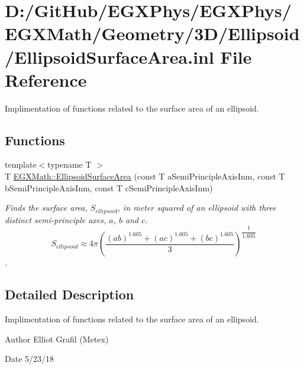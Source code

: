 \hypertarget{_ellipsoid_surface_area_8inl}{}\section{D\+:/\+Git\+Hub/\+E\+G\+X\+Phys/\+E\+G\+X\+Phys/\+E\+G\+X\+Math/\+Geometry/3\+D/\+Ellipsoid/\+Ellipsoid\+Surface\+Area.inl File Reference}
\label{_ellipsoid_surface_area_8inl}


Implimentation of functions related to the surface area of an ellipsoid.  


\subsection*{Functions}
\begin{DoxyCompactItemize}
\item 
{\footnotesize template$<$typename T $>$ }\\T \mbox{\hyperlink{group___e_g_x_math-_geometry-3_d-_ellipsoid-_surface_area_gae1dfe0a51a3adc5121de3ced76b4068c}{E\+G\+X\+Math\+::\+Ellipsoid\+Surface\+Area}} (const T a\+Semi\+Principle\+Axis\+Inm, const T b\+Semi\+Principle\+Axis\+Inm, const T c\+Semi\+Principle\+Axis\+Inm)
\begin{DoxyCompactList}\small\item\em Finds the surface area, $S_{ellipsoid}$, in meter squared of an ellipsoid with three distinct semi-\/principle axes, $a$, $b$ and $c$. \[ S_{ellipsoid} \approx 4 \pi \left ( \dfrac{(ab)^{1.605}+(ac)^{1.605}+(bc)^{1.605}}{3} \right )^{\dfrac{1}{1.605}} \]. \end{DoxyCompactList}\end{DoxyCompactItemize}


\subsection{Detailed Description}
Implimentation of functions related to the surface area of an ellipsoid. 

\begin{DoxyAuthor}{Author}
Elliot Grafil (Metex) 
\end{DoxyAuthor}
\begin{DoxyDate}{Date}
5/23/18 
\end{DoxyDate}

